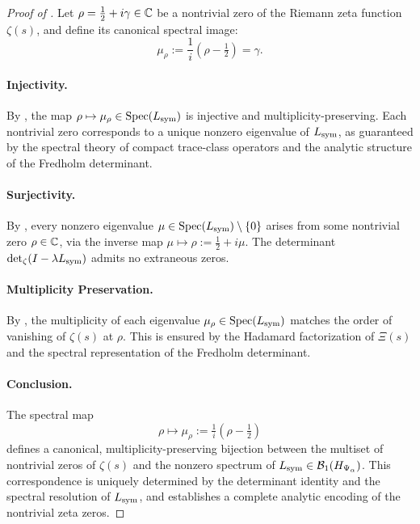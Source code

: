 \begin{proof}[Proof of ]
Let \( \rho = \tfrac{1}{2} + i\gamma \in \mathbb{C} \) be a nontrivial zero of the Riemann zeta function \( \zeta(s) \), and define its canonical spectral image:
\[
\mu_\rho := \frac{1}{i}(\rho - \tfrac{1}{2}) = \gamma.
\]

\paragraph{Injectivity.}
By , the map \( \rho \mapsto \mu_\rho \in \operatorname{Spec}(L_{\mathrm{sym}}) \) is injective and multiplicity-preserving. Each nontrivial zero corresponds to a unique nonzero eigenvalue of \( L_{\mathrm{sym}} \), as guaranteed by the spectral theory of compact trace-class operators and the analytic structure of the Fredholm determinant.

\paragraph{Surjectivity.}
By , every nonzero eigenvalue \( \mu \in \operatorname{Spec}(L_{\mathrm{sym}}) \setminus \{0\} \) arises from some nontrivial zero \( \rho \in \mathbb{C} \), via the inverse map \( \mu \mapsto \rho := \tfrac{1}{2} + i\mu \). The determinant \( \det\nolimits_{\zeta}(I - \lambda L_{\mathrm{sym}}) \) admits no extraneous zeros.

\paragraph{Multiplicity Preservation.}
By , the multiplicity of each eigenvalue \( \mu_\rho \in \operatorname{Spec}(L_{\mathrm{sym}}) \) matches the order of vanishing of \( \zeta(s) \) at \( \rho \). This is ensured by the Hadamard factorization of \( \Xi(s) \) and the spectral representation of the Fredholm determinant.

\paragraph{Conclusion.}
The spectral map
\[
\rho \longmapsto \mu_\rho := \tfrac{1}{i}(\rho - \tfrac{1}{2})
\]
defines a canonical, multiplicity-preserving bijection between the multiset of nontrivial zeros of \( \zeta(s) \) and the nonzero spectrum of \( L_{\mathrm{sym}} \in \mathcal{B}_1(H_{\Psi_\alpha}) \). This correspondence is uniquely determined by the determinant identity and the spectral resolution of \( L_{\mathrm{sym}} \), and establishes a complete analytic encoding of the nontrivial zeta zeros.
\end{proof}
